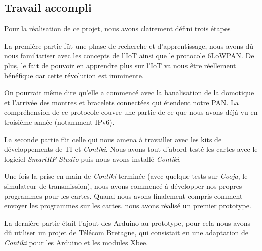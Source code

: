 
\subsection{Travail accompli}

Pour la réalisation de ce projet, nous avons clairement défini trois étapes

La première partie fût une phase de recherche et d'apprentissage, nous avons dû nous familiariser avec les concepts de l'IoT ainsi que le protocole 6LoWPAN.
De plus, le fait de pouvoir en apprendre plus sur l'IoT va nous être réellement bénéfique car cette révolution est imminente.

On pourrait même dire qu’elle a commencé avec la banalisation de la domotique et l'arrivée des montres et bracelets connectées qui étendent notre PAN.
La compréhension de ce protocole couvre une partie de ce que nous avons déjà vu en troisième année (notamment IPv6).

La seconde partie fût celle qui nous amena à travailler avec les kits de développements de TI et \textit{Contiki}. Nous avons tout d'abord testé les cartes avec le logiciel \textit{SmartRF Studio} puis nous avons installé \textit{Contiki}.

Une fois la prise en main de \textit{Contiki} terminée (avec quelque tests sur \textit{Cooja}, le simulateur de transmission), nous avons commencé à développer nos propres programmes pour les cartes. Quand nous avons finalement compris comment envoyer les programmes sur les cartes, nous avons réalisé un premier prototype.

La dernière partie était l'ajout des Arduino au prototype, pour cela nous avons dû utiliser un projet de Télécom Bretagne, qui consistait en une adaptation de \textit{Contiki} pour les Arduino et les modules Xbee.
